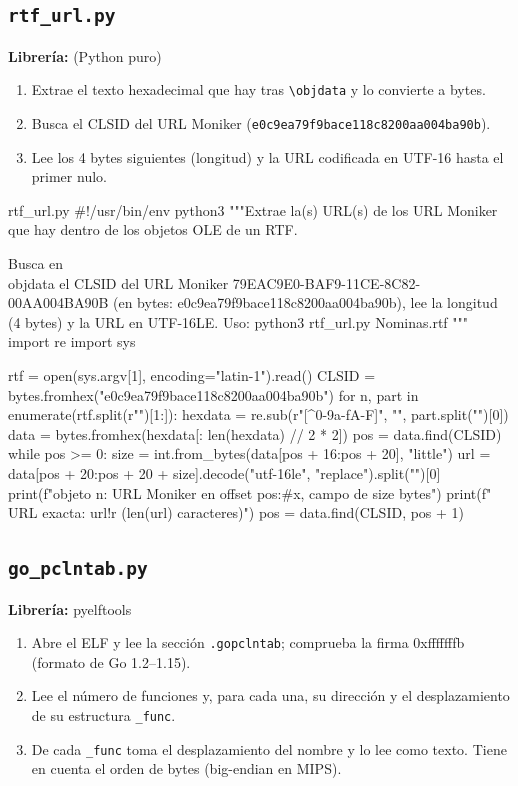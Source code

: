 \documentclass[11pt,a4paper]{article}
\begin{document}
\subsection{\texttt{rtf\_url.py}}
\textbf{Librería:} (Python puro)
\begin{enumerate}

\item Extrae el texto hexadecimal que hay tras \texttt{\textbackslash{}objdata} y lo convierte a bytes.

\item Busca el CLSID del URL Moniker (\texttt{e0c9ea79f9bace118c8200aa004ba90b}).

\item Lee los 4 bytes siguientes (longitud) y la URL codificada en UTF-16 hasta el primer nulo.

\end{enumerate}

\begin{codigopython}{rtf\_url.py}
#!/usr/bin/env python3
"""Extrae la(s) URL(s) de los URL Moniker que hay dentro de los objetos OLE de un RTF.

Busca en \\objdata el CLSID del URL Moniker {79EAC9E0-BAF9-11CE-8C82-00AA004BA90B}
(en bytes: e0c9ea79f9bace118c8200aa004ba90b), lee la longitud (4 bytes) y la URL en UTF-16LE.
Uso: python3 rtf_url.py Nominas.rtf
"""
import re
import sys

rtf = open(sys.argv[1], encoding="latin-1").read()
CLSID = bytes.fromhex("e0c9ea79f9bace118c8200aa004ba90b")
for n, part in enumerate(rtf.split(r"{\*\objdata")[1:]):
    hexdata = re.sub(r"[^0-9a-fA-F]", "", part.split("}")[0])
    data = bytes.fromhex(hexdata[: len(hexdata) // 2 * 2])
    pos = data.find(CLSID)
    while pos >= 0:
        size = int.from_bytes(data[pos + 16:pos + 20], "little")
        url = data[pos + 20:pos + 20 + size].decode("utf-16le", "replace").split("")[0]
        print(f"objeto {n}: URL Moniker en offset {pos:#x}, campo de {size} bytes")
        print(f"  URL exacta: {url!r}  ({len(url)} caracteres)")
        pos = data.find(CLSID, pos + 1)
\end{codigopython}

\subsection{\texttt{go\_pclntab.py}}
\textbf{Librería:} pyelftools
\begin{enumerate}

\item Abre el ELF y lee la sección \texttt{.gopclntab}; comprueba la firma 0xfffffffb (formato de Go 1.2--1.15).

\item Lee el número de funciones y, para cada una, su dirección y el desplazamiento de su estructura \texttt{\_func}.

\item De cada \texttt{\_func} toma el desplazamiento del nombre y lo lee como texto. Tiene en cuenta el orden de bytes (big-endian en MIPS).

\end{enumerate}
\end{document}
